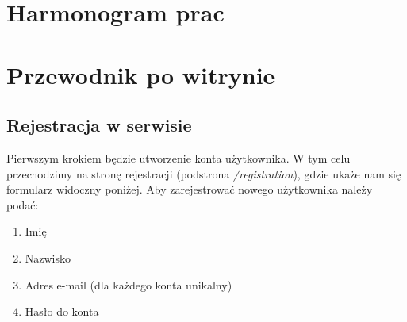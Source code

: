 \documentclass[12pt,a4paper,titlepage]{article}
\begin{document}
\newpage
\section{Harmonogram prac}

\begin{figure}[H]
    \centering
    
\end{figure}

\newpage
\section{Przewodnik po witrynie}

\subsection{Rejestracja w serwisie}
Pierwszym krokiem będzie utworzenie konta użytkownika. W tym celu przechodzimy na stronę rejestracji (podstrona \textit{/registration}), gdzie ukaże nam się formularz widoczny poniżej. Aby zarejestrować nowego użytkownika należy podać:
\begin{enumerate}
    \item Imię
    \item Nazwisko
    \item Adres e-mail (dla każdego konta unikalny)
    \item Hasło do konta
\end{enumerate}
\end{document}
